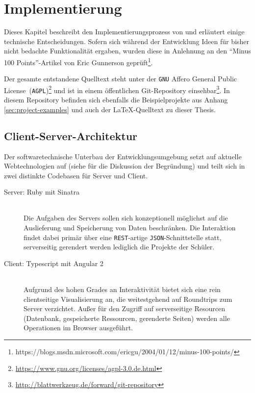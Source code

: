 \section{Implementierung}
\label{sec:implementation-analysis}

Dieses Kapitel beschreibt den Implementierungsprozess von \idename{} und erläutert einige technische Entscheidungen. Sofern sich während der Entwicklung Ideen für bisher nicht bedachte Funktionalität ergaben, wurden diese in Anlehnung an den "`Minus 100 Points"'-Artikel von Eric Gunnerson geprüft\footnote{https://blogs.msdn.microsoft.com/ericgu/2004/01/12/minus-100-points/}.

Der gesamte entstandene Quelltext steht unter der \texttt{GNU} Affero General Public License~(\texttt{AGPL})\footnote{\url{https://www.gnu.org/licenses/agpl-3.0.de.html}} und ist in einem öffentlichen Git-Repository einsehbar\footnote{\url{http://blattwerkzeug.de/forward/git-repository}}. In diesem Repository befinden sich ebenfalls die Beispielprojekte aus Anhang \ref{sec:project-examples} und auch der \LaTeX-Quelltext zu dieser Thesis.


\subsection{Client-Server-Architektur}
\label{sec:implementation-client-server}

Der softwaretechnische Unterbau der Entwicklungsumgebung setzt auf aktuelle Webtechnologien auf (siehe  für die Diskussion der Begründung) und teilt sich in zwei distinkte Codebasen für Server und Client.

\begin{description}
\item[Server: Ruby mit Sinatra] \hfill\\
  Die Aufgaben des Servers sollen sich konzeptionell möglichst auf die Auslieferung und Speicherung von Daten beschränken. Die Interaktion findet dabei primär über eine \texttt{REST}-artige \texttt{JSON}-Schnittstelle statt, serverseitig gerendert werden lediglich die Projekte der Schüler.
\item[Client: Typescript mit Angular 2] \hfill\\
  Aufgrund des hohen Grades an Interaktivität bietet sich eine rein clientseitige Visualisierung an, die weitestgehend auf Roundtrips zum Server verzichtet. Außer für den Zugriff auf serverseitige Resourcen (Datenbank, gespeicherte Ressourcen, gerenderte Seiten) werden alle Operationen im Browser ausgeführt.
\end{description}

